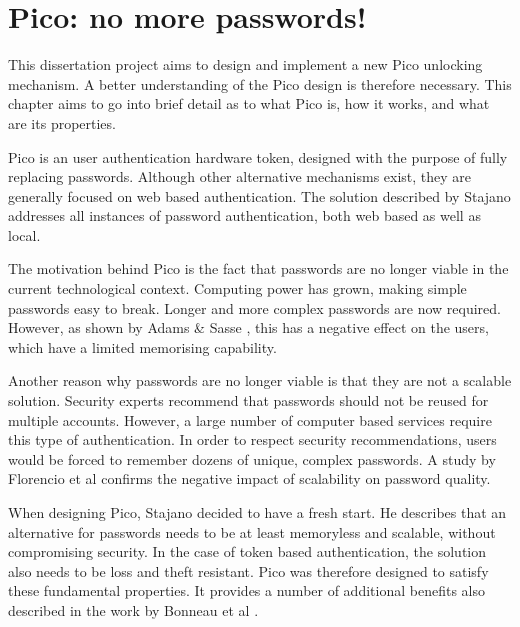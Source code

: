 
\chapter{Pico: no more passwords!} %

\label{Chapter2}


This dissertation project aims to design and implement a new Pico unlocking mechanism. A better understanding of the Pico design \cite{stajano2011pico} is therefore necessary. This chapter aims to go into brief detail as to what Pico is, how it works, and what are its properties.

Pico is an user authentication hardware token, designed with the purpose of fully replacing passwords. Although other alternative mechanisms exist, they are generally focused on web based authentication. The solution described by Stajano addresses all instances of password authentication, both web based as well as local.

The motivation behind Pico is the fact that passwords are no longer viable in the current technological context. Computing power has grown, making simple passwords easy to break. Longer and more complex passwords are now required. However, as shown by Adams \& Sasse \cite{adams1999users}, this has a negative effect on the users, which have a limited memorising capability.

Another reason why passwords are no longer viable is that they are not a scalable solution. Security experts recommend that passwords should not be reused for multiple accounts. However, a large number of computer based services require this type of authentication. In order to respect security recommendations, users would be forced to remember dozens of unique, complex passwords. A study by Florencio et al \cite{florencio2007large} confirms the negative impact of scalability on password quality.

When designing Pico, Stajano \cite{stajano2011pico} decided to have a fresh start. He describes that an alternative for passwords needs to be at least memoryless and scalable, without compromising security. In the case of token based authentication, the solution also needs to be loss and theft resistant. Pico was therefore designed to satisfy these fundamental properties. It provides a number of additional benefits also described in the work by Bonneau et al \cite{bonneau2012quest}.

